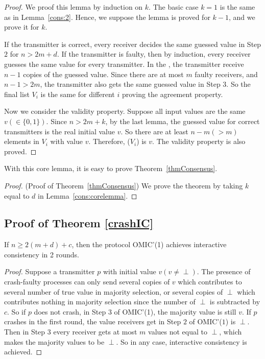 \begin{proof}
We proof this lemma by induction on $k$. The basic case $k=1$ is the same as in Lemma~\ref{cons:2}.
Hence, we suppose the lemma is proved for $k-1$, and we prove it for $k$.

If the transmitter is correct, every receiver decides the same guessed value in Step $2$ for $n>2m+d$. 
If the transmitter is faulty, then
by induction, every receiver  guesses the same value for every transmitter. 
In the , the transmitter receive $n-1$ copies of the guessed value. 
Since there are at most $m$ faulty receivers, and $n-1>2m$, the transmitter 
also gets the same guessed value in Step $3$. 
So the final list $V_i$ is the same for different $i$ proving the agreement property. 

Now we consider  the validity property.
Suppose all input values are the same $v(\in \{0,1\})$. 
Since $n>2m+k$, by the last lemma, the guessed value for correct transmitters is the real initial value $v$. So there are at least $n-m (> m)$ elements in $V_i$ with value $v$. Therefore, ($V_i$) is $v$. 
The validity property is also proved.
\end{proof}

With this core lemma, it is easy to prove Theorem~\ref{thmConsensus}.
\begin{proof}{(Proof of Theorem~\ref{thmConsensus})}
We prove the theorem by taking $k$ equal to $d$ in Lemma~\ref{cons:corelemma}.
\end{proof}

\iffalse
\subsection{Proof of Theorem \ref{crashIC}}

\begin{lemma}
  If $n \geqslant 2 ( m+d )+c$, then the protocol OMIC'(1) achieves
  interactive consistency in 2 rounds.
\end{lemma}

\begin{proof}
  Suppose a transmitter $p$ with initial value $v ( v \neq \perp )$. The
  presence of crash-faulty processes can only send several copies of $v$ which
  contributes to several number of true value in majority selection, or
  several copies of $\perp$ which contributes nothing in majority selection
  since the number of $\perp$ is subtracted by $c$. So if $p$ does not crash,
  in Step $3$ of OMIC'(1), the majority value is still $v$. If $p$ crashes in
  the first round, the value receivers get in Step $2$ of OMIC'($1$) is
  $\perp$. Then in Step $3$ every receiver gets at most $m$ values not equal
  to $\perp$, which makes the majority values to be $\perp$. So in any case,
  interactive consistency is achieved.
\end{proof}

